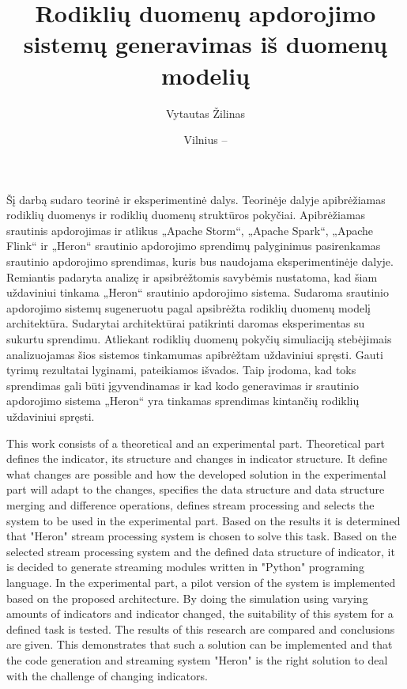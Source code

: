 \documentclass{VUMIFPSbakalaurinis}
\title{Rodiklių duomenų apdorojimo sistemų generavimas iš duomenų modelių}
\author{Vytautas Žilinas}
\date{Vilnius – \the\year}
\begin{document}
 
\maketitle

\cleardoublepage{}
\setcounter{page}{2}

Šį darbą sudaro teorinė ir eksperimentinė dalys. Teorinėje dalyje apibrėžiamas rodiklių duomenys ir rodiklių duomenų struktūros pokyčiai. Apibrėžiamas srautinis apdorojimas ir atlikus „Apache Storm“, „Apache Spark“, „Apache Flink“ ir „Heron“ srautinio apdorojimo sprendimų palyginimus pasirenkamas srautinio apdorojimo sprendimas, kuris bus naudojama eksperimentinėje dalyje. Remiantis padaryta analizę ir apsibrėžtomis savybėmis nustatoma, kad šiam uždaviniui tinkama „Heron“ srautinio apdorojimo sistema. Sudaroma srautinio apdorojimo sistemų sugeneruotu pagal apsibrėžta rodiklių duomenų modelį architektūra. Sudarytai architektūrai patikrinti daromas eksperimentas su sukurtu sprendimu. Atliekant rodiklių duomenų pokyčių simuliaciją stebėjimais analizuojamas šios sistemos tinkamumas apibrėžtam uždaviniui spręsti. Gauti tyrimų rezultatai lyginami, pateikiamos išvados. Taip įrodoma, kad toks sprendimas gali būti įgyvendinamas ir kad kodo generavimas ir srautinio apdorojimo sistema „Heron“ yra tinkamas sprendimas kintančių rodiklių uždaviniui spręsti.

This work consists of a theoretical and an experimental part. Theoretical part defines the indicator, its structure and changes in indicator structure. It define what changes are possible and how the developed solution in the experimental part will adapt to the changes, specifies the data structure and data structure merging and difference operations, defines stream processing and selects the system to be used in the experimental part. Based on the results it is determined that "Heron" stream processing system is chosen to solve this task. Based on the selected stream processing system and the defined data structure of indicator, it is decided to generate streaming modules written in "Python" programing language. In the experimental part, a pilot version of the system is implemented based on the proposed architecture. By doing the simulation using varying amounts of indicators and indicator changed, the suitability of this system for a defined task is tested. The results of this research are compared and conclusions are given. This demonstrates that such a solution can be implemented and that the code generation and streaming system "Heron" is the right solution to deal with the challenge of changing indicators.
\end{document}
